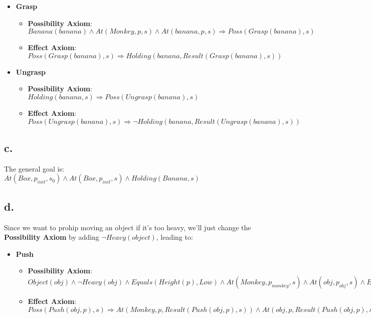 \documentclass{article}
\begin{document}
\begin{itemize}
\begin{itemize}
                        \item \textbf{Effect Axiom}: $Poss(ClimbDown(box), s)\Rightarrow$\\
                            $At(Monkey, p_{box}, Result(ClimbDown(box), s))$
                    \end{itemize}
                \item \textbf{Grasp}
                    \begin{itemize}
                        \item \textbf{Possibility Axiom}: $Banana(banana)\land At(Monkey, p, s)\land At(banana, p, s)\Rightarrow Poss(Grasp(banana), s)$
                        \item \textbf{Effect Axiom}: $Poss(Grasp(banana), s)\Rightarrow Holding(banana, Result(Grasp(banana), s))$
                    \end{itemize}
                \item \textbf{Ungrasp}
                    \begin{itemize}
                        \item \textbf{Possibility Axiom}: $Holding(banana, s)\Rightarrow Poss(Ungrasp(banana), s)$
                        \item \textbf{Effect Axiom}: $Poss(Ungrasp(banana), s)\Rightarrow \lnot Holding(banana, Result(Ungrasp(banana), s))$
                    \end{itemize}
            \end{itemize}
        \subsection{c.}
            The general goal is:\\
            $At(Box, p_{init}, s_0)\land At(Box, p_{init}, s)\land Holding(Banana, s)$
        \subsection{d.}
            Since we want to prohip moving an object if it's too heavy, we'll just change the \textbf{Possibility Axiom} by adding $\lnot Heavy(object)$, leading to:
            \begin{itemize}
                \item \textbf{Push}
                    \begin{itemize}
                        \item \textbf{Possibility Axiom}: $Object(obj)\land \lnot Heavy(obj)\land Equals(Height(p), Low)\land At(Monkey,p_{monkey}, s)\land At(obj, p_{obj}, s)\land Equals(p_{monkey}, p_{obj})\land Equals(Height(p_{monkey}), Low) \Rightarrow Poss(Push(obj, p), s)$
                        \item \textbf{Effect Axiom}: $Poss(Push(obj, p), s)\Rightarrow At(Monkey, p, Result(Push(obj, p), s)) \land At(obj, p, Result(Push(obj, p), s))$
                    \end{itemize}
            \end{itemize}
\end{document}
